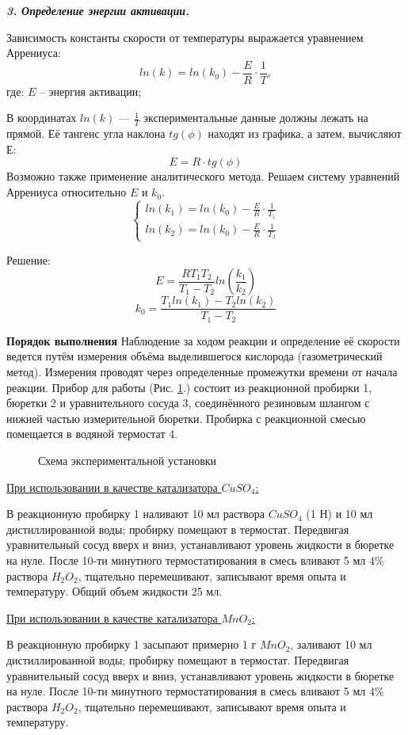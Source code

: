 \textit{\textbf{3. Определение энергии активации.}}

Зависимость константы скорости от температуры выражается уравнением Аррениуса:
$$ln(k)=ln(k_{0})-\frac{E}{R}\cdot\frac{1}{T},$$
где: $E$ -- энергия активации;

В координатах $ln(k)$ --- $\frac{1}{T}$ экспериментальные данные должны лежать на прямой. Её тангенс угла наклона $tg(\phi)$ находят из графика, а затем, вычисляют Е:
$$E=R\cdot tg(\phi)$$
Возможно также применение аналитического метода. Решаем систему уравнений Аррениуса относительно $E$ и $k_{0}$.
$$
\begin{cases}
ln(k_{1})= ln(k_{0})-\frac{E}{R}\cdot\frac{1}{T_{1}}\\
ln(k_{2})= ln(k_{0})-\frac{E}{R}\cdot\frac{1}{T_{2}}
\end{cases}
$$

Решение:
$$E=\frac{RT_{1}T_{2}}{T_{1}-T_{2}}ln\left(\frac{k_{1}}{k_{2}}\right)$$
$$k_{0}=\frac{T_{1}ln(k_{1})-T_{2}ln(k_{2})}{T_{1}-T_{2}}$$

\textbf{Порядок выполнения}
Наблюдение за ходом реакции и определение её скорости ведется путём измерения объёма выделившегося кислорода (газометрический метод). Измерения проводят через определенные промежутки времени от начала реакции. Прибор для работы (Рис. \ref{ris:image22_1}.) состоит из реакционной пробирки 1, бюретки 2 и уравнительного сосуда 3, соединённого резиновым шлангом с нижней частью измерительной бюретки.
Пробирка с реакционной смесью помещается в водяной термостат 4.

\begin{figure}[h]
\caption{Схема экспериментальной установки}
\label{ris:image22_1}
\end{figure}
\underline{При использовании в качестве катализатора $CuSO_{4}$:}

В реакционную пробирку 1 наливают 10 мл раствора $CuSO_{4}$ (1 Н) и 10 мл дистиллированной воды; пробирку помещают в термостат. Передвигая уравнительный сосуд вверх и вниз, устанавливают уровень жидкости в бюретке на нуле. После 10-ти минутного термостатирования в смесь вливают 5 мл 4\% раствора $H_{2}O_{2}$, тщательно перемешивают, записывают время опыта и температуру. Общий объем жидкости 25 мл.

\underline{При использовании в качестве катализатора $MnO_{2}$:}

В реакционную пробирку 1 засыпают примерно 1 г $MnO_{2}$, заливают 10 мл дистиллированной воды; пробирку помещают в термостат. Передвигая уравнительный сосуд вверх и вниз, устанавливают уровень жидкости в бюретке на нуле. После 10-ти минутного термостатирования в смесь вливают 5 мл 4\% раствора $H_{2}O_{2}$, тщательно перемешивают, записывают время опыта и температуру. 

